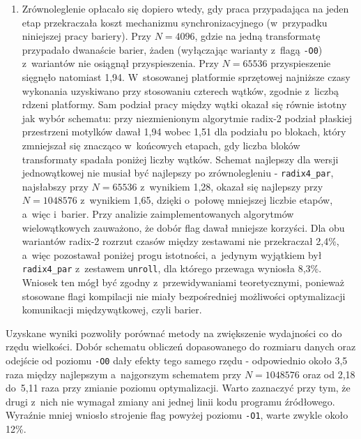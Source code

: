 \begin{enumerate}
    \item Zrównoleglenie opłacało się dopiero wtedy, gdy praca przypadająca na
          jeden etap przekraczała koszt mechanizmu synchronizacyjnego
          (w~przypadku niniejszej pracy bariery). Przy $N=4096$, gdzie na jedną
          transformatę przypadało dwanaście barier, żaden (wyłączając warianty
          z~flagą \texttt{-O0}) z~wariantów nie osiągnął przyspieszenia. Przy
          $N=65536$ przyspieszenie sięgnęło natomiast 1,94. W~stosowanej
          platformie sprzętowej najniższe czasy wykonania uzyskiwano przy
          stosowaniu czterech wątków, zgodnie z~liczbą rdzeni platformy. Sam
          podział pracy między wątki okazał się równie istotny jak wybór
          schematu: przy niezmienionym algorytmie radix-2 podział płaskiej
          przestrzeni motylków dawał 1,94 wobec 1,51 dla podziału po blokach,
          który zmniejszał się znacząco w~końcowych etapach, gdy liczba bloków
          transformaty spadała poniżej liczby wątków. Schemat najlepszy dla
          wersji jednowątkowej nie musiał być najlepszy po zrównolegleniu -
          \texttt{radix4\_par}, najsłabszy przy $N=65536$ z~wynikiem 1,28, okazał
          się najlepszy przy $N=1048576$ z~wynikiem 1,65, dzięki o~połowę
          mniejszej liczbie etapów, a~więc i~barier. Przy analizie
          zaimplementowanych algorytmów wielowątkowych zauważono, że dobór flag
          dawał mniejsze korzyści. Dla obu wariantów radix-2 rozrzut czasów
          między zestawami nie przekraczał 2,4\%, a~więc pozostawał poniżej progu
          istotności, a~jedynym wyjątkiem był \texttt{radix4\_par} z~zestawem
          \texttt{unroll}, dla którego przewaga wyniosła 8,3\%. Wniosek ten mógł
          być zgodny z~przewidywaniami teoretycznymi, ponieważ stosowane flagi
          kompilacji nie miały bezpośredniej możliwości optymalizacji komunikacji
          międzywątkowej, czyli barier.
\end{enumerate}

Uzyskane wyniki pozwoliły porównać metody na zwiększenie wydajności co do rzędu
wielkości. Dobór schematu obliczeń dopasowanego do rozmiaru danych oraz
odejście od poziomu \texttt{-O0} dały efekty tego samego rzędu - odpowiednio
około 3,5 raza między najlepszym a~najgorszym schematem przy $N=1048576$ oraz
od 2,18 do~5,11 raza przy zmianie poziomu optymalizacji. Warto zaznaczyć przy
tym, że drugi z~nich nie wymagał zmiany ani jednej linii kodu programu
źródłowego. Wyraźnie mniej wniosło strojenie flag powyżej poziomu \texttt{-O1},
warte zwykle około 12\%.

